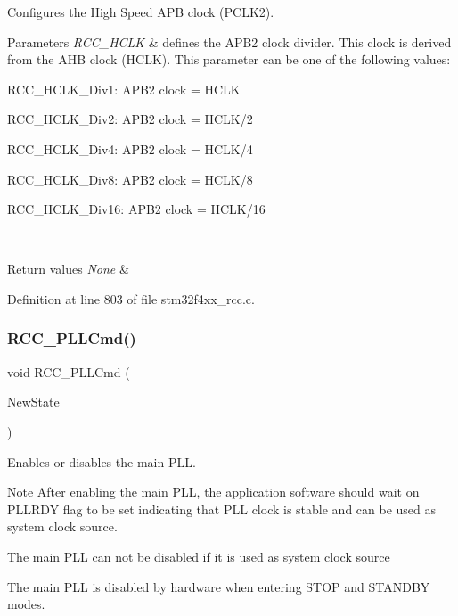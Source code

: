 Configures the High Speed A\+PB clock (P\+C\+L\+K2). 


\begin{DoxyParams}{Parameters}
{\em R\+C\+C\+\_\+\+H\+C\+LK} & defines the A\+P\+B2 clock divider. This clock is derived from the A\+HB clock (H\+C\+LK). This parameter can be one of the following values\+: \begin{DoxyItemize}
\item R\+C\+C\+\_\+\+H\+C\+L\+K\+\_\+\+Div1\+: A\+P\+B2 clock = H\+C\+LK \item R\+C\+C\+\_\+\+H\+C\+L\+K\+\_\+\+Div2\+: A\+P\+B2 clock = H\+C\+L\+K/2 \item R\+C\+C\+\_\+\+H\+C\+L\+K\+\_\+\+Div4\+: A\+P\+B2 clock = H\+C\+L\+K/4 \item R\+C\+C\+\_\+\+H\+C\+L\+K\+\_\+\+Div8\+: A\+P\+B2 clock = H\+C\+L\+K/8 \item R\+C\+C\+\_\+\+H\+C\+L\+K\+\_\+\+Div16\+: A\+P\+B2 clock = H\+C\+L\+K/16 \end{DoxyItemize}
\\
\hline
\end{DoxyParams}

\begin{DoxyRetVals}{Return values}
{\em None} & \\
\hline
\end{DoxyRetVals}


Definition at line 803 of file stm32f4xx\+\_\+rcc.\+c.

\mbox{\label{group___r_c_c_ga84dee53c75e58fdb53571716593c2272}} 
\subsubsection{\texorpdfstring{R\+C\+C\+\_\+\+P\+L\+L\+Cmd()}{RCC\_PLLCmd()}}
{\footnotesize\ttfamily void R\+C\+C\+\_\+\+P\+L\+L\+Cmd (\begin{DoxyParamCaption}\item[{Functional\+State}]{New\+State }\end{DoxyParamCaption})}



Enables or disables the main P\+LL. 

\begin{DoxyNote}{Note}
After enabling the main P\+LL, the application software should wait on P\+L\+L\+R\+DY flag to be set indicating that P\+LL clock is stable and can be used as system clock source. 

The main P\+LL can not be disabled if it is used as system clock source 

The main P\+LL is disabled by hardware when entering S\+T\+OP and S\+T\+A\+N\+D\+BY modes. 
\end{DoxyNote}

